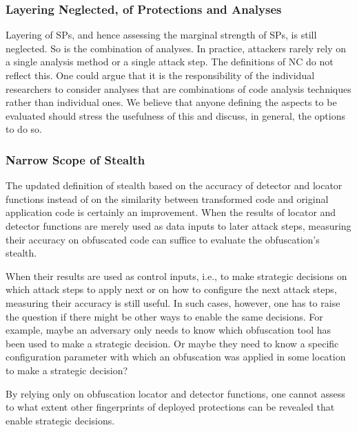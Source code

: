 \subsubsection{Layering Neglected, of Protections and Analyses}
Layering of SPs, and hence assessing the marginal strength of SPs, is still neglected. So is the combination of analyses. In practice, attackers rarely rely on a single analysis method or a single attack step. The definitions of NC do not reflect this. One could argue that it is the responsibility of the individual researchers to consider analyses that are combinations of code analysis techniques rather than individual ones. We believe that anyone defining the aspects to be evaluated should stress the usefulness of this and discuss, in general, the options to do so. 

\subsubsection{Narrow Scope of Stealth}
\label{sec:narrow_stealth}
The updated definition of stealth based on the accuracy of detector and locator functions instead of on the similarity between transformed code and original application code is certainly an improvement. When the results of locator and detector functions are merely used as data inputs to later attack steps, measuring their accuracy on obfuscated code can suffice to evaluate the obfuscation's stealth.

When their results are used as control inputs, i.e., to make strategic decisions on which attack steps to apply next or on how to configure the next attack steps, measuring their accuracy is still useful. In such cases, however, one has to raise the question if there might be other ways to enable the same decisions. For example, maybe an adversary only needs to know which obfuscation tool has been used to make a strategic decision. Or maybe they need to know a specific configuration parameter with which an obfuscation was applied in some location to make a strategic decision? 

By relying only on obfuscation locator and detector functions, one cannot assess to what extent other fingerprints of deployed protections can be revealed that enable strategic decisions. 
